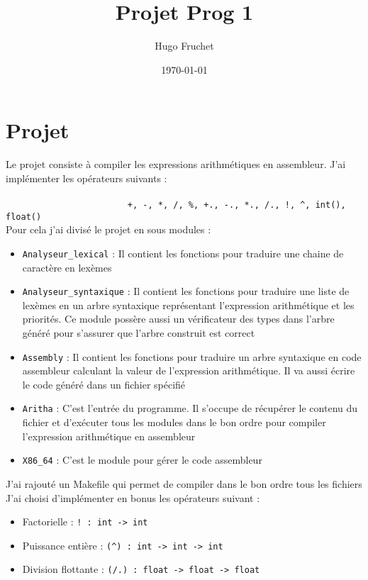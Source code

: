 \documentclass{report}
\title{Projet Prog 1}
\author{Hugo Fruchet}
\date{\today}
\begin{document}
\maketitle
\section{Projet}
Le projet consiste à compiler les expressions arithmétiques en assembleur. J'ai implémenter les opérateurs suivants : \\ \\
{\verb|                        +, -, *, /, %, +., -., *., /., !, ^, int(), float()|} \\
Pour cela j'ai divisé le projet en sous modules :
\begin{itemize}
  \item \verb|Analyseur_lexical| : Il contient les fonctions pour traduire une chaine de caractère en lexèmes
  \item \verb|Analyseur_syntaxique| : Il contient les fonctions pour traduire une liste de lexèmes en un arbre syntaxique représentant l'expression arithmétique et les priorités. Ce module possère aussi un vérificateur des types dans l'arbre généré pour s'assurer que l'arbre construit est correct
  \item \verb|Assembly| : Il contient les fonctions pour traduire un arbre syntaxique en code assembleur calculant la valeur de l'expression arithmétique. Il va aussi écrire le code généré dans un fichier spécifié
  \item \verb|Aritha| : C'est l'entrée du programme. Il s'occupe de récupérer le contenu du fichier et d'exécuter tous les modules dans le bon ordre pour compiler l'expression arithmétique en assembleur
  \item \verb|X86_64| : C'est le module pour gérer le code assembleur
\end{itemize}
J'ai rajouté un Makefile qui permet de compiler dans le bon ordre tous les fichiers \\

J'ai choisi d'implémenter en bonus les opérateurs suivant :
\begin{itemize}
  \item Factorielle : \verb|! : int -> int|
  \item Puissance entière : \verb|(^) : int -> int -> int|
  \item Division flottante : \verb|(/.) : float -> float -> float|
\end{itemize}
\end{document}

